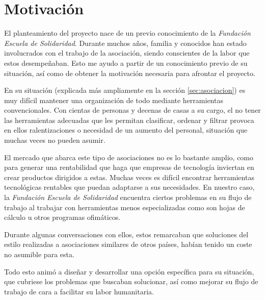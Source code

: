 \section{Motivación}

El planteamiento del proyecto nace de un previo conocimiento de la \textit{Fundación Escuela de Solidaridad}. Durante muchos años, familia y conocidos han estado involucrados con el trabajo de la asociación, siendo conscientes de la labor que estos desempeñaban. Esto me ayudo a partir de un conocimiento previo de su situación, así como de obtener la motivación necesaria para afrontar el proyecto.

En su situación (explicada más ampliamente en la sección \ref{sec:asociacion}) es muy difícil mantener una organización de todo mediante herramientas convencionales. Con cientas de personas y decenas de casas a su cargo, el no tener las herramientas adecuadas que les permitan clasificar, ordenar y filtrar provoca en ellos ralentizaciones o necesidad de un aumento del personal, situación que muchas veces no pueden asumir. 

El mercado que abarca este tipo de asociaciones no es lo bastante amplio, como para generar una rentabilidad que haga que empresas de tecnología inviertan en crear productos dirigidos a estas. Muchas veces es difícil encontrar herramientas tecnológicas rentables que puedan adaptarse a sus necesidades. En nuestro caso, la \textit{Fundación Escuela de Solidaridad} encuentra ciertos problemas en su flujo de trabajo al trabajar con herramientas menos especializadas como son hojas de cálculo u otros programas ofimáticos. 

Durante algunas conversaciones con ellos, estos remarcaban que soluciones del estilo realizadas a asociaciones similares de otros países, habían tenido un coste no asumible para esta.

Todo esto animó a diseñar y desarrollar una opción específica para su situación, que cubriese los problemas que buscaban solucionar, así como mejorar su flujo de trabajo de cara a facilitar su labor humanitaria.  